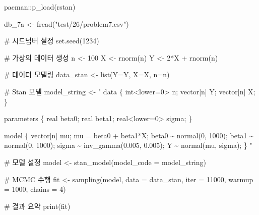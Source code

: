 \documentclass[
  letterpaper,
  DIV=11,
  numbers=noendperiod]{scrreprt}
\newenvironment{Shaded}{\begin{snugshade}}{\end{snugshade}}
\newcommand{\AttributeTok}[1]{\textcolor[rgb]{0.40,0.45,0.13}{#1}}
\newcommand{\CommentTok}[1]{\textcolor[rgb]{0.37,0.37,0.37}{#1}}
\newcommand{\DecValTok}[1]{\textcolor[rgb]{0.68,0.00,0.00}{#1}}
\newcommand{\FunctionTok}[1]{\textcolor[rgb]{0.28,0.35,0.67}{#1}}
\newcommand{\NormalTok}[1]{\textcolor[rgb]{0.00,0.23,0.31}{#1}}
\newcommand{\OtherTok}[1]{\textcolor[rgb]{0.00,0.23,0.31}{#1}}
\newcommand{\SpecialCharTok}[1]{\textcolor[rgb]{0.37,0.37,0.37}{#1}}
\newcommand{\StringTok}[1]{\textcolor[rgb]{0.13,0.47,0.30}{#1}}
\begin{document}
\begin{Shaded}
\begin{Highlighting}[]
\NormalTok{pacman}\SpecialCharTok{::}\FunctionTok{p\_load}\NormalTok{(rstan)}

\NormalTok{db\_7a }\OtherTok{\textless{}{-}} \FunctionTok{fread}\NormalTok{(}\StringTok{"test/26/problem7.csv"}\NormalTok{)}


\CommentTok{\# 시드넘버 설정}
\FunctionTok{set.seed}\NormalTok{(}\DecValTok{1234}\NormalTok{)}

\CommentTok{\# 가상의 데이터 생성}
\NormalTok{n }\OtherTok{\textless{}{-}} \DecValTok{100}
\NormalTok{X }\OtherTok{\textless{}{-}} \FunctionTok{rnorm}\NormalTok{(n)}
\NormalTok{Y }\OtherTok{\textless{}{-}} \DecValTok{2}\SpecialCharTok{*}\NormalTok{X }\SpecialCharTok{+} \FunctionTok{rnorm}\NormalTok{(n)}

\CommentTok{\# 데이터 모델링}
\NormalTok{data\_stan }\OtherTok{\textless{}{-}} \FunctionTok{list}\NormalTok{(}\AttributeTok{Y=}\NormalTok{Y, }\AttributeTok{X=}\NormalTok{X, }\AttributeTok{n=}\NormalTok{n)}

\CommentTok{\# Stan 모델}
\NormalTok{model\_string }\OtherTok{\textless{}{-}} \StringTok{"}
\StringTok{data \{}
\StringTok{  int\textless{}lower=0\textgreater{} n;}
\StringTok{  vector[n] Y;}
\StringTok{  vector[n] X;}
\StringTok{\}}

\StringTok{parameters \{}
\StringTok{  real beta0;}
\StringTok{  real beta1;}
\StringTok{  real\textless{}lower=0\textgreater{} sigma;}
\StringTok{\}}

\StringTok{model \{}
\StringTok{  vector[n] mu;}
\StringTok{  mu = beta0 + beta1*X;}
\StringTok{  }
\StringTok{  beta0 \textasciitilde{} normal(0, 1000);}
\StringTok{  beta1 \textasciitilde{} normal(0, 1000);}
\StringTok{  sigma \textasciitilde{} inv\_gamma(0.005, 0.005);}
\StringTok{  }
\StringTok{  Y \textasciitilde{} normal(mu, sigma);}
\StringTok{\}}
\StringTok{"}

\CommentTok{\# 모델 설정}
\NormalTok{model }\OtherTok{\textless{}{-}} \FunctionTok{stan\_model}\NormalTok{(}\AttributeTok{model\_code =}\NormalTok{ model\_string)}

\CommentTok{\# MCMC 수행}
\NormalTok{fit }\OtherTok{\textless{}{-}} \FunctionTok{sampling}\NormalTok{(model, }\AttributeTok{data =}\NormalTok{ data\_stan, }\AttributeTok{iter =} \DecValTok{11000}\NormalTok{, }\AttributeTok{warmup =} \DecValTok{1000}\NormalTok{, }\AttributeTok{chains =} \DecValTok{4}\NormalTok{)}

\CommentTok{\# 결과 요약}
\FunctionTok{print}\NormalTok{(fit)}
\end{Highlighting}
\end{Shaded}
\end{document}
